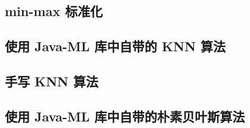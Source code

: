 \documentclass[a4paper, 11pt, cn]{elegantpaper}
\begin{document}
\subsection{min-max 标准化}

\subsection{使用 Java-ML 库中自带的 KNN 算法}

\subsection{手写 KNN 算法}

\subsection{使用 Java-ML 库中自带的朴素贝叶斯算法}

\appendix

\nocite{*}
\printbibliography[heading=bibintoc, title=\ebibname]
\end{document}
